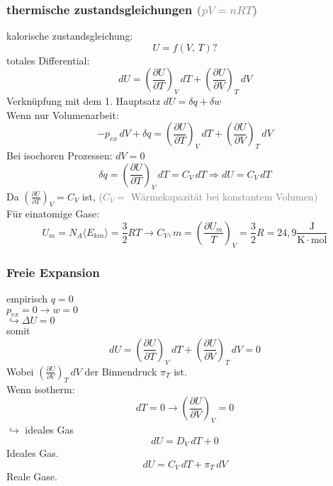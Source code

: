 \documentclass[a4paper, fleqn]{article}
\begin{document}
\subsubsection{thermische zustandsgleichungen \textcolor{gray}{($pV=nRT$)}}
kalorische zustandsgleichung:
\begin{equation*}
    U = f(V,\,T) ?
\end{equation*}
totales Differential:
\begin{equation*}
    dU = \left(\frac{\partial U}{\partial T}\right)_V\,dT+\left(\frac{\partial U}{\partial V}\right)_T\,dV
\end{equation*}
Verknüpfung mit dem 1. Hauptsatz $dU = \delta q + \delta w$\\
Wenn nur Volumenarbeit:
\begin{equation*}
    -p_{ex}\,dV + \delta q = \left(\frac{\partial U}{\partial T}\right)_V\,dT+\left(\frac{\partial U}{\partial V}\right)_T\,dV
\end{equation*}
Bei isochoren Prozessen: $dV = 0$
\begin{equation*}
    \delta q = \left(\frac{\partial U}{\partial T}\right)_V \,dT = C_V \,dT \Rightarrow dU = C_V \,dT
\end{equation*}
Da $\left(\frac{\partial U}{\partial T}\right)_V = C_V$ ist, \textcolor{gray}{($C_V =$ Wärmekapazität bei konstantem Volumen)}\\
Für einatomige Gase:
\begin{equation*}
    U_m = N_A\langle E_{kin}\rangle = \frac{3}{2}RT \rightarrow C_V,m = \left(\frac{\partial U_m}{T}\right)_V = \frac{3}{2}R = 24,9 \mathrm{\frac{J}{K \cdot mol}}
\end{equation*}

\subsubsection{Freie Expansion}
empirisch $q = 0$\\
$p_{ex}=0 \rightarrow w=0$\\
$\hookrightarrow \Delta U =0$\\
somit
\begin{equation*}
    dU = \left(\frac{\partial U}{\partial T}\right)_V\,dT+\left(\frac{\partial U}{\partial V}\right)_T\,dV = 0
\end{equation*}
Wobei $\left(\frac{\partial U}{\partial V}\right)_T\,dV$ der Binnendruck $\pi_T$ ist.\\
Wenn isotherm:
\begin{equation*}
    dT = 0 \rightarrow \left(\frac{\partial U}{\partial V}\right)_V = 0
\end{equation*}
$\hookrightarrow$ ideales Gas
\begin{equation*}
    dU = D_V\, dT + 0
\end{equation*}
Ideales Gas.\\
\begin{equation*}
    dU = C_V\, dT + \pi_T \,dV
\end{equation*}
Reale Gase.\\
\end{document}
